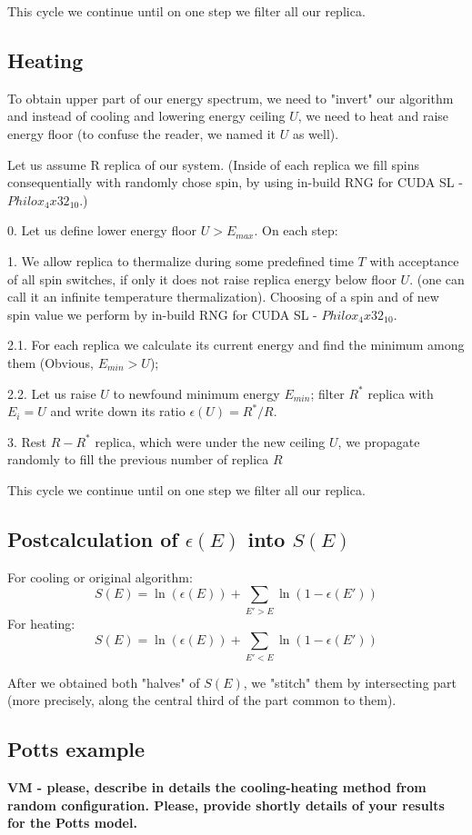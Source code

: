 \documentclass[aps,prl,amssymb,amsmath,twocolumn,floatfix]{revtex4}
\begin{document}
This cycle we continue until on one step we filter all our replica.


\subsection{Heating}

To obtain upper part of our energy spectrum, we need to "invert" our algorithm and instead of cooling and lowering energy ceiling $U$, we need to heat and raise energy floor (to confuse the reader, we named it $U$ as well). 

Let us assume R replica of our system. (Inside of each replica we fill spins consequentially with randomly chose spin, by using in-build RNG for CUDA SL - $Philox_4x32_10$.)

0. Let us define lower energy floor $U > E_{max}$. On each step:

1. We allow replica to thermalize during some predefined time $T$ with acceptance of all spin switches, if only it does not raise replica energy below floor $U$. (one can call it an infinite temperature thermalization). Choosing of a spin and of new spin value we perform by in-build RNG for CUDA SL - $Philox_4x32_10$.

2.1. For each replica we calculate its current energy and find the minimum among them (Obvious, $E_{min} > U$);

2.2. Let us raise $U$ to newfound minimum energy $E_{min}$; filter $R^*$ replica with $E_i = U$ and write down its ratio $\epsilon(U) = R^*/R$.

3. Rest $R-R^*$ replica, which were under the new ceiling $U$, we propagate randomly to fill the previous number of replica $R$

This cycle we continue until on one step we filter all our replica.

\subsection{Postcalculation of $\epsilon(E)$ into $S(E)$}
For cooling or original algorithm:
$$
S(E) = \ln(\epsilon(E)) + \sum_{E'>E} \ln(1 - \epsilon(E'))
$$
For heating: 
$$
S(E) = \ln(\epsilon(E)) + \sum_{E'<E} \ln(1 - \epsilon(E'))
$$

After we obtained both "halves" of $S(E)$, we "stitch" them by intersecting part (more precisely, along the central third of the part common to them).


\subsection{Potts example}
{\bf VM - please, describe in details the cooling-heating method from random configuration. Please, provide shortly details of your results for the Potts model.}
\end{document}
